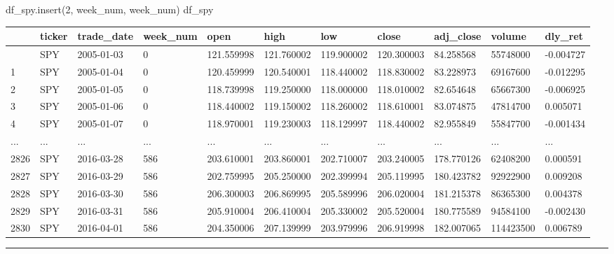 \documentclass[
  letterpaper,
  DIV=11,
  numbers=noendperiod]{scrreprt}
\newenvironment{Shaded}{\begin{snugshade}}{\end{snugshade}}
\newcommand{\DecValTok}[1]{\textcolor[rgb]{0.68,0.00,0.00}{#1}}
\newcommand{\NormalTok}[1]{\textcolor[rgb]{0.00,0.23,0.31}{#1}}
\newcommand{\StringTok}[1]{\textcolor[rgb]{0.13,0.47,0.30}{#1}}
\begin{document}
\begin{Shaded}
\begin{Highlighting}[]
\NormalTok{df\_spy.insert(}\DecValTok{2}\NormalTok{, }\StringTok{\textquotesingle{}week\_num\textquotesingle{}}\NormalTok{, week\_num)}
\NormalTok{df\_spy}
\end{Highlighting}
\end{Shaded}

\begin{longtable}[]{@{}lllllllllll@{}}
\toprule\noalign{}
& ticker & trade\_date & week\_num & open & high & low & close &
adj\_close & volume & dly\_ret \\
\midrule\noalign{}
\endhead
\bottomrule\noalign{}
\endlastfoot
0 & SPY & 2005-01-03 & 0 & 121.559998 & 121.760002 & 119.900002 &
120.300003 & 84.258568 & 55748000 & -0.004727 \\
1 & SPY & 2005-01-04 & 0 & 120.459999 & 120.540001 & 118.440002 &
118.830002 & 83.228973 & 69167600 & -0.012295 \\
2 & SPY & 2005-01-05 & 0 & 118.739998 & 119.250000 & 118.000000 &
118.010002 & 82.654648 & 65667300 & -0.006925 \\
3 & SPY & 2005-01-06 & 0 & 118.440002 & 119.150002 & 118.260002 &
118.610001 & 83.074875 & 47814700 & 0.005071 \\
4 & SPY & 2005-01-07 & 0 & 118.970001 & 119.230003 & 118.129997 &
118.440002 & 82.955849 & 55847700 & -0.001434 \\
... & ... & ... & ... & ... & ... & ... & ... & ... & ... & ... \\
2826 & SPY & 2016-03-28 & 586 & 203.610001 & 203.860001 & 202.710007 &
203.240005 & 178.770126 & 62408200 & 0.000591 \\
2827 & SPY & 2016-03-29 & 586 & 202.759995 & 205.250000 & 202.399994 &
205.119995 & 180.423782 & 92922900 & 0.009208 \\
2828 & SPY & 2016-03-30 & 586 & 206.300003 & 206.869995 & 205.589996 &
206.020004 & 181.215378 & 86365300 & 0.004378 \\
2829 & SPY & 2016-03-31 & 586 & 205.910004 & 206.410004 & 205.330002 &
205.520004 & 180.775589 & 94584100 & -0.002430 \\
2830 & SPY & 2016-04-01 & 586 & 204.350006 & 207.139999 & 203.979996 &
206.919998 & 182.007065 & 114423500 & 0.006789 \\
\end{longtable}

\begin{center}\rule{0.5\linewidth}{0.5pt}\end{center}
\end{document}
